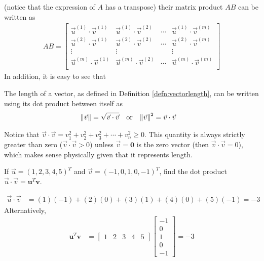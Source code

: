 (notice that the expression of $A$ has a transpose) their matrix product $AB$ can be written as
\begin{align*}
AB =
\begin{bmatrix}
\vec{u}^{(1)} \cdot \vec{v}^{(1)} & \vec{u}^{(1)} \cdot \vec{v}^{(2)} & \cdots & \vec{u}^{(1)} \cdot \vec{v}^{(m)} \\
\vec{u}^{(2)} \cdot \vec{v}^{(1)} & \vec{u}^{(2)} \cdot \vec{v}^{(2)} & \cdots & \vec{u}^{(2)} \cdot \vec{v}^{(m)} \\
\vdots & \vdots & & \vdots \\
\vec{u}^{(m)} \cdot \vec{v}^{(1)} & \vec{u}^{(m)} \cdot \vec{v}^{(2)} & \cdots & \vec{u}^{(m)} \cdot \vec{v}^{(m)} \\
\end{bmatrix}
\end{align*}
In addition, it is easy to see that
\begin{proper}
\label{proper:lengthdot}
The length of a vector, as defined in Definition \ref{defn:vectorlength}, can be written using its dot product between itself as
\begin{align*}
\norm{\vec{v}} &= \sqrt{\vec{v} \cdot \vec{v}} & &\text{or} &
\norm{\vec{v}}^2 &= \vec{v} \cdot \vec{v}
\end{align*}
\end{proper}
Notice that $\vec{v} \cdot \vec{v} = v_1^2 + v_2^2 + v_3^2 + \cdots + v_n^2 \geq 0$. This quantity is always strictly greater than zero ($\vec{v} \cdot \vec{v} > 0$) unless $\vec{v} = \textbf{0}$ is the zero vector (then $\vec{v} \cdot \vec{v} = 0$), which makes sense physically given that it represents length.

\begin{exmp}
\label{exmp:dotproduct5d}
If $\vec{u} = (1, 2, 3, 4, 5)^T$ and $\vec{v} = (-1, 0, 1, 0, -1)^T$, find the dot product $\vec{u} \cdot \vec{v} = \textbf{u}^T\textbf{v}$.
\end{exmp}
\begin{solution}
\begin{align*}
\vec{u} \cdot \vec{v} &= (1)(-1) + (2)(0) + (3)(1) + (4)(0) + (5)(-1) = -3
\end{align*}
Alternatively,
\begin{align*}
\textbf{u}^T\textbf{v} &=
\begin{bmatrix}
1 & 2 & 3 & 4 & 5
\end{bmatrix}
\begin{bmatrix}
-1 \\
0 \\
1 \\
0 \\
-1
\end{bmatrix}
= -3
\end{align*}
\end{solution}

